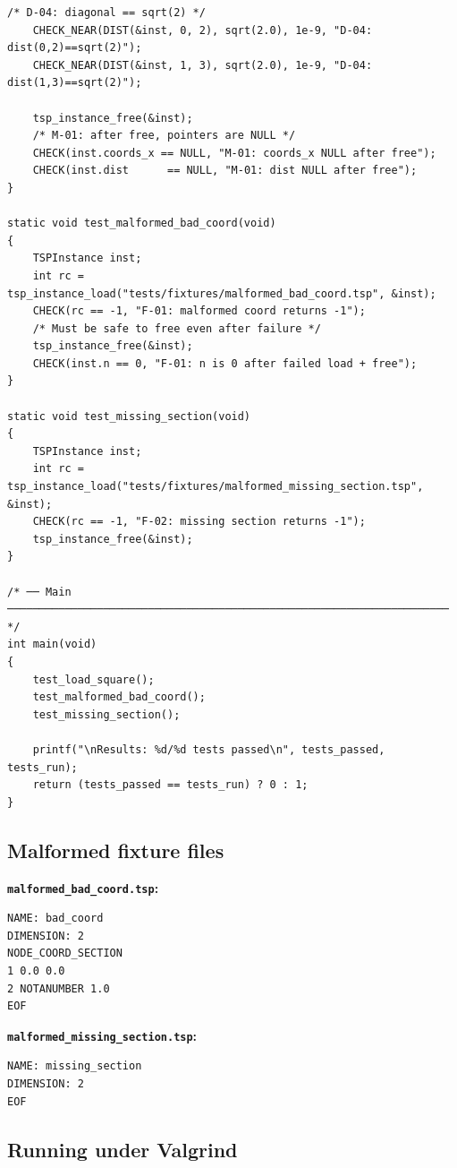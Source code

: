 \documentclass[11pt]{article}
\begin{document}
\begin{lstlisting}[style=cstyle]
    /* D-04: diagonal == sqrt(2) */
    CHECK_NEAR(DIST(&inst, 0, 2), sqrt(2.0), 1e-9, "D-04: dist(0,2)==sqrt(2)");
    CHECK_NEAR(DIST(&inst, 1, 3), sqrt(2.0), 1e-9, "D-04: dist(1,3)==sqrt(2)");

    tsp_instance_free(&inst);
    /* M-01: after free, pointers are NULL */
    CHECK(inst.coords_x == NULL, "M-01: coords_x NULL after free");
    CHECK(inst.dist      == NULL, "M-01: dist NULL after free");
}

static void test_malformed_bad_coord(void)
{
    TSPInstance inst;
    int rc = tsp_instance_load("tests/fixtures/malformed_bad_coord.tsp", &inst);
    CHECK(rc == -1, "F-01: malformed coord returns -1");
    /* Must be safe to free even after failure */
    tsp_instance_free(&inst);
    CHECK(inst.n == 0, "F-01: n is 0 after failed load + free");
}

static void test_missing_section(void)
{
    TSPInstance inst;
    int rc = tsp_instance_load("tests/fixtures/malformed_missing_section.tsp", &inst);
    CHECK(rc == -1, "F-02: missing section returns -1");
    tsp_instance_free(&inst);
}

/* ── Main ───────────────────────────────────────────────────────────────────── */
int main(void)
{
    test_load_square();
    test_malformed_bad_coord();
    test_missing_section();

    printf("\nResults: %d/%d tests passed\n", tests_passed, tests_run);
    return (tests_passed == tests_run) ? 0 : 1;
}
\end{lstlisting}

\subsection{Malformed fixture files}

\textbf{\texttt{malformed\_bad\_coord.tsp}:}
\begin{lstlisting}[style=cstyle, language={}, numbers=none]
NAME: bad_coord
DIMENSION: 2
NODE_COORD_SECTION
1 0.0 0.0
2 NOTANUMBER 1.0
EOF
\end{lstlisting}

\textbf{\texttt{malformed\_missing\_section.tsp}:}
\begin{lstlisting}[style=cstyle, language={}, numbers=none]
NAME: missing_section
DIMENSION: 2
EOF
\end{lstlisting}

\subsection{Running under Valgrind}
\end{document}
